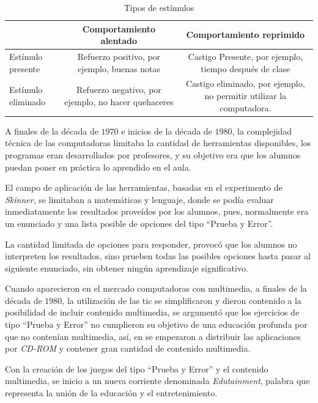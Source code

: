 \begin{table}[!hbt]
\begin{center}
\begin{tabulary}{\textwidth}{|L|C|C|}
\hline
& Comportamiento alentado & Comportamiento reprimido \\
\hline
Estímulo presente & Refuerzo positivo, por ejemplo, buenas notas & Castigo
Presente, por ejemplo, tiempo después de clase \\
\hline
Estímulo eliminado & Refuerzo negativo, por ejemplo, no hacer quehaceres &
Castigo eliminado, por ejemplo, no permitir utilizar la computadora. \\
\hline
\end{tabulary}
\end{center}
\caption{Tipos de estímulos}
\label{tab:conductismo_estimulo}
\end{table}

A finales de la década de $1970$ e inicios de la década de $1980$,  la
complejidad técnica de las computadoras limitaba la cantidad de herramientas
disponibles, los programas eran desarrollados por profesores, y su objetivo era
que los alumnos puedan poner en práctica lo aprendido en el aula. 


El campo de aplicación de las herramientas, basadas en el experimento de
\textit{Skinner}, se limitaban a matemáticas y lenguaje, donde se podía evaluar
inmediatamente los resultados proveídos por los alumnos, pues, normalmente era
un enunciado y una lista posible de opciones del tipo \enquote{Prueba y
    Error}\cite{leinonen:ict}. 

La cantidad limitada de opciones para responder, provocó que los alumnos no
interpreten los resultados, sino prueben todas las posibles opciones hasta
pasar al siguiente enunciado, sin obtener ningún aprendizaje
significativo\cite{leinonen:ict}.

Cuando aparecieron en el mercado computadoras con multimedia, a finales de la
década de $1980$, la utilización de las \Gls{tic} se simplificaron y dieron
contenido a la posibilidad de incluir contenido multimedia, se argumentó que los
ejercicios de tipo \enquote{Prueba y Error} no cumplieron su objetivo de una
educación profunda por que no contenían multimedia\cite{leinonen:ict}, así, en
se empezaron a distribuir las aplicaciones por \textit{CD-ROM} y contener gran
cantidad de contenido multimedia.

Con la creación de los juegos del tipo \enquote{Prueba y Error} y el contenido
multimedia, se inicio a un nueva corriente denominada \emph{Edutainment},
palabra que representa la unión de la educación y el entretenimiento. 


